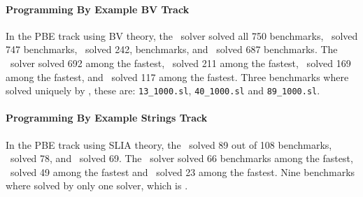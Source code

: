 \paragraph{Programming By Example BV Track}
In the PBE track using BV theory, the \ethree\ solver solved all 750 benchmarks, \euphony\ solved 747 benchmarks, \eusolvernew\ solved 242, benchmarks, and \cvcnew\ solved 687 benchmarks. The \ethree\ solver solved 692 among the fastest, \eusolvernew\ solved 211 among the fastest, \cvcnew\ solved 169 among the fastest, and \euphony\ solved 117 among the fastest. Three benchmarks where solved uniquely by \ethree, these are: \texttt{13_1000.sl}, \texttt{40_1000.sl} and \texttt{89_1000.sl}.

\paragraph{Programming By Example Strings Track}
In the PBE track using SLIA theory, the \cvcnew\ solved 89 out of 108 benchmarks, \euphony\ solved 78, and \eusolvernew\ solved 69. The \euphony\ solver solved 66 benchmarks among the fastest, \cvcnew\ solved 49 among the fastest and \eusolvernew\ solved 23 among the fastest. Nine benchmarks where solved by only one solver, which is \cvcnew.